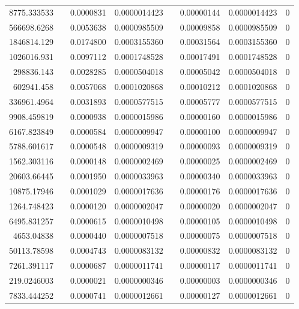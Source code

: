 \documentclass[
journal=jacsat, %
manuscript=article]{achemso}
\begin{document}
\begin{table}[htbp]
{\begin{tabular}{rrrrrrrr}
    8775.333533 &       & 0.0000831 & 0.0000014423 &       & 0.00000144 & 0.0000014423 & 0 \\
    566698.6268 &       & 0.0053638 & 0.0000985509 &       & 0.00009858 & 0.0000985509 & 0 \\
    1846814.129 &       & 0.0174800 & 0.0003155360 &       & 0.00031564 & 0.0003155360 & 0 \\
    1026016.931 &       & 0.0097112 & 0.0001748528 &       & 0.00017491 & 0.0001748528 & 0 \\
    298836.143 &       & 0.0028285 & 0.0000504018 &       & 0.00005042 & 0.0000504018 & 0 \\
    602941.458 &       & 0.0057068 & 0.0001020868 &       & 0.00010212 & 0.0001020868 & 0 \\
    336961.4964 &       & 0.0031893 & 0.0000577515 &       & 0.00005777 & 0.0000577515 & 0 \\
    9908.459819 &       & 0.0000938 & 0.0000015986 &       & 0.00000160 & 0.0000015986 & 0 \\
    6167.823849 &       & 0.0000584 & 0.0000009947 &       & 0.00000100 & 0.0000009947 & 0 \\
    5788.601617 &       & 0.0000548 & 0.0000009319 &       & 0.00000093 & 0.0000009319 & 0 \\
    1562.303116 &       & 0.0000148 & 0.0000002469 &       & 0.00000025 & 0.0000002469 & 0 \\
    20603.66445 &       & 0.0001950 & 0.0000033963 &       & 0.00000340 & 0.0000033963 & 0 \\
    10875.17946 &       & 0.0001029 & 0.0000017636 &       & 0.00000176 & 0.0000017636 & 0 \\
    1264.748423 &       & 0.0000120 & 0.0000002047 &       & 0.00000020 & 0.0000002047 & 0 \\
    6495.831257 &       & 0.0000615 & 0.0000010498 &       & 0.00000105 & 0.0000010498 & 0 \\
    4653.04838 &       & 0.0000440 & 0.0000007518 &       & 0.00000075 & 0.0000007518 & 0 \\
    50113.78598 &       & 0.0004743 & 0.0000083132 &       & 0.00000832 & 0.0000083132 & 0 \\
    7261.391117 &       & 0.0000687 & 0.0000011741 &       & 0.00000117 & 0.0000011741 & 0 \\
    219.0246003 &       & 0.0000021 & 0.0000000346 &       & 0.00000003 & 0.0000000346 & 0 \\
    7833.444252 &       & 0.0000741 & 0.0000012661 &       & 0.00000127 & 0.0000012661 & 0 \\

\end{tabular}}
\end{table}
\end{document}
